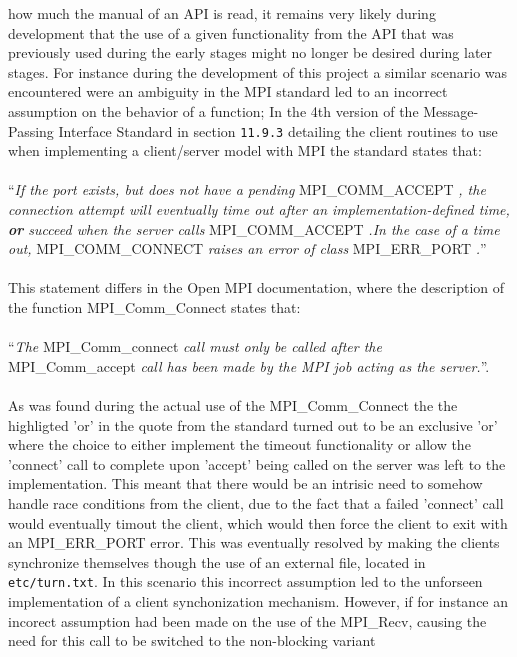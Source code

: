 \documentclass[11pt]{article}
\begin{document}
how much the manual of an API is read, it remains very likely during development
that the use of a given functionality from the API that was previously used
during the early stages might no longer be desired during later stages. For
instance during the development of this project a similar scenario was
encountered were an ambiguity in the MPI standard led to an incorrect assumption
on the behavior of a function; In the 4th version of the Message-Passing
Interface Standard in section \texttt{11.9.3} detailing the client routines to
use when implementing a client/server model with MPI the standard states
that:\\\\ ``\textit{If the port exists, but does not have a pending}
MPI\_COMM\_ACCEPT \textit{, the connection attempt will eventually time out
  after an implementation-defined time, \textbf{or} succeed when the server
  calls} MPI\_COMM\_ACCEPT \textit{.In the case of a time out,}
MPI\_COMM\_CONNECT \textit{raises an error of class } MPI\_ERR\_PORT
\textit{.}''\\\\ This statement differs in the Open MPI documentation, where the
description of the function MPI\_Comm\_Connect states that:\\\\ ``\textit{The}
MPI\_Comm\_connect \textit{call must only be called after the} MPI\_Comm\_accept
\textit{call has been made by the MPI job acting as the server.}''.\\\\ As was
found during the actual use of the MPI\_Comm\_Connect the the highligted 'or' in
the quote from the standard turned out to be an exclusive 'or' where the choice
to either implement the timeout functionality or allow the 'connect' call to
complete upon 'accept' being called on the server was left to the
implementation. This meant that there would be an intrisic need to somehow
handle race conditions from the client, due to the fact that a failed 'connect'
call would eventually timout the client, which would then force the client to
exit with an MPI\_ERR\_PORT error. This was eventually resolved by making the
clients synchronize themselves though the use of an external file, located in
\texttt{etc/turn.txt}. In this scenario this incorrect assumption led to the
unforseen implementation of a client synchonization mechanism. However, if for
instance an incorect assumption had been made on the use of the MPI\_Recv,
causing the need for this call to be switched to the non-blocking variant
\end{document}
